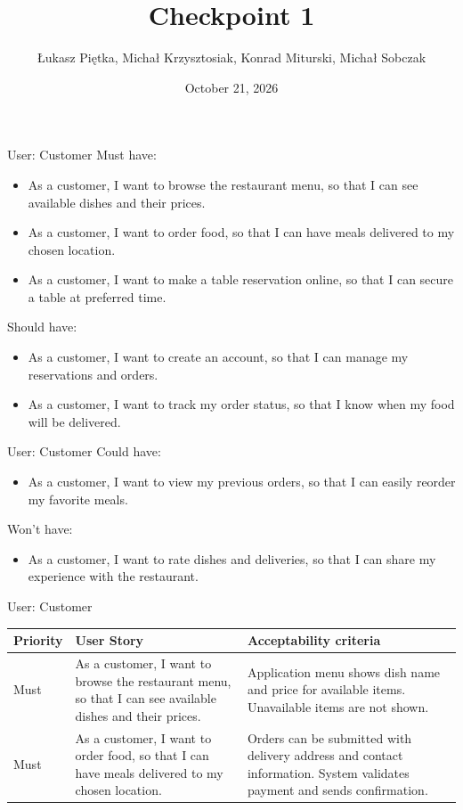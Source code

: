 \documentclass{beamer}
\date{October 21, 2026}
\author{Łukasz Piętka, Michał Krzysztosiak, Konrad Miturski, Michał Sobczak}
\title{Checkpoint 1}
\begin{document}
\maketitle

\begin{frame}{User: Customer}
Must have:
\begin{itemize}
\item As a customer, I want to browse the restaurant menu, so that I can see available dishes and their prices.
\item As a customer, I want to order food, so that I can have meals delivered to my chosen location.
\item As a customer, I want to make a table reservation online, so that I can secure a table at preferred time.
\end{itemize}
Should have:
\begin{itemize}
\item As a customer, I want to create an account, so that I can manage my reservations and orders.
\item As a customer, I want to track my order status, so that I know when my food will be delivered.
\end{itemize}
\end{frame}

\begin{frame}{User: Customer}
Could have:
\begin{itemize}
\item As a customer, I want to view my previous orders, so that I can easily reorder my favorite meals.
\end{itemize}
Won't have:
\begin{itemize}
\item As a customer, I want to rate dishes and deliveries, so that I can share my experience with the restaurant.
\end{itemize}
\end{frame}

\begin{frame}{User: Customer}
\begin{tabular}{| l | p{4cm} | p{4cm} |}
\hline
Priority & User Story & Acceptability criteria \\
\hline
Must & As a customer, I want to browse the restaurant menu, so that I can see available dishes and their prices.
     & Application menu shows dish name and price for available items. Unavailable items are not shown. \\
\hline
Must & As a customer, I want to order food, so that I can have meals delivered to my chosen location.
     & Orders can be submitted with delivery address and contact information. System validates payment and sends confirmation. \\
\hline
\end{tabular}
\end{frame}
\end{document}
